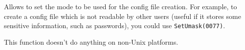 


\label{wxfileconfigsetumask}


Allows to set the mode to be used for the config file creation. For example, to
create a config file which is not readable by other users (useful if it stores
some sensitive information, such as passwords), you could use 
{\tt SetUmask(0077)}.

This function doesn't do anything on non-Unix platforms.





